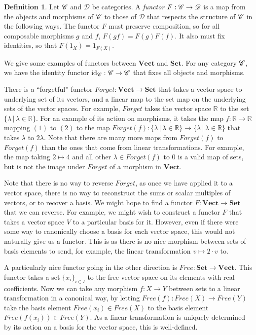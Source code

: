 \documentclass[a4paper,12pt,leqno]{article} \usepackage{amsmath}
\newcommand{\RR}{\mathbb{R}} \newcommand{\QQ}{\mathbb{Q}}
\newcommand{\curD}{\mathscr{D}} \newcommand{\curI}{\mathscr{I}}
\newcommand{\id}{\ensuremath{\operatorname{id}}}
\theoremstyle{definition}
\newtheorem{defn}{Definition}
\begin{document}
\begin{defn}
  Let $\mathscr{C}$ and $\curD$ be categories.
  A \emph{functor} $F: \curC\to \curD$ is a map from the objects and morphisms
  of $\mathscr{C}$ to those of $\curD$ that respects the structure of $\mathscr{C}$ in the
  following ways.
  The functor $F$ must preserve composition, so for all composable morphisms
  $g$ and $f$, $F(gf) = F(g)F(f)$.
  It also must fix identities, so that $F(1_X) = 1_{F(X)}$.
\end{defn}

We give some examples of functors between $\textbf{Vect}$ and $\textbf{Set}$.
For any category $\mathscr{C}$, we have the identity functor $\id_{\curC}:
\curC\to \curC$ that fixes all objects and morphisms.

There is a ``forgetful'' functor $Forget: \textbf{Vect}\to \textbf{Set}$ that
takes a vector space to underlying set of its vectors, and a linear map to the
set map on the underlying sets of the vector spaces.
For example, $Forget$ takes the vector space $\RR$ to the set $\{\lambda\,|\,
\lambda\in\RR\}$.
For an example of its action on morphisms, it takes the map $f: \RR\to\RR$
mapping $(1)$ to $(2)$ to the map
$Forget(f): \{\lambda\,|\,\lambda\in\RR\}\to \{\lambda\,|\,\lambda\in\RR\}$
that takes $\lambda$ to $2\lambda$.
Note that there are many more maps from $Forget(f)$ to $Forget(f)$ than the
ones that come from linear transformations.
For example, the map taking $2\mapsto 4$ and all other $\lambda\in Forget(f)$
to $0$ is a valid map of sets, but is not the image under $Forget$ of
a morphism in $\textbf{Vect}$.

Note that there is no way to reverse $Forget$, as once we have applied it to
a vector space, there is no way to reconstruct the sums or scalar multiples of
vectors, or to recover a basis.
We might hope to find a functor $F: \textbf{Vect}\to\textbf{Set}$ that we can
reverse.
For example, we might wish to construct a functor $F$ that takes a vector space
$V$ to a particular basis for it.
However, even if there were some way to canonically choose a basis for each
vector space, this would not naturally give us a functor.
This is as there is no nice morphism between sets of basis elements to send,
for example, the linear transformation $v\mapsto 2\cdot v$ to.

A particularly nice functor going in the other direction is $Free:
\textbf{Set}\to \textbf{Vect}$.
This functor takes a set $\{x_i\}_{i\in I}$ to the free vector space on its
elements with real coefficients.
Now we can take any morphism $f: X\to Y$ between sets to a linear
transformation in a canonical way, by letting $Free(f): Free(X)\to Free(Y)$
take the basis element $Free(x_i)\in Free(X)$ to the basis element
$Free(f(x_i))\in Free(Y)$.
As a linear transformation is uniquely determined by its action on a basis for
the vector space, this is well-defined.
\end{document}
